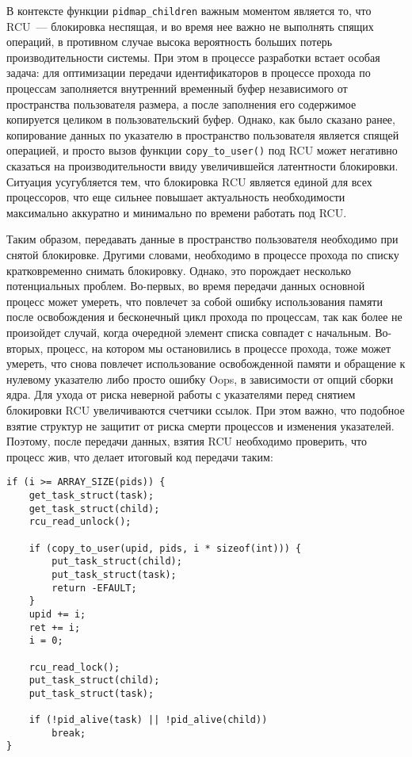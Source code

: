 В контексте функции \texttt{pidmap\_children} важным моментом является то, что
RCU~--- блокировка неспящая, и во время нее важно не выполнять спящих операций,
в противном случае высока вероятность больших потерь производительности системы.
При этом в процессе разработки встает особая задача: для оптимизации передачи
идентификаторов в процессе прохода по процессам заполняется внутренний временный
буфер независимого от пространства пользователя размера, а после заполнения его
содержимое копируется целиком в пользовательский буфер. Однако, как было сказано
ранее, копирование данных по указателю в пространство пользователя является
спящей операцией, и просто вызов функции \texttt{copy\_to\_user()} под RCU может
негативно сказаться на производительности ввиду увеличившейся латентности
блокировки. Ситуация усугубляется тем, что блокировка RCU является единой для
всех процессоров, что еще сильнее повышает актуальность необходимости
максимально аккуратно и минимально по времени работать под RCU.

Таким образом, передавать данные в пространство пользователя необходимо при
снятой блокировке. Другими словами, необходимо в процессе прохода по списку
кратковременно снимать блокировку. Однако, это порождает несколько потенциальных
проблем. Во-первых, во время передачи данных основной процесс может умереть, что
повлечет за собой ошибку использования памяти после освобождения и бесконечный
цикл прохода по процессам, так как более не произойдет случай, когда очередной
элемент списка совпадет с начальным. Во-вторых, процесс, на котором мы
остановились в процессе прохода, тоже может умереть, что снова повлечет
использование освобожденной памяти и обращение к нулевому указателю либо просто
ошибку Oops, в зависимости от опций сборки ядра. Для ухода от риска неверной
работы с указателями перед снятием блокировки RCU увеличиваются счетчики ссылок.
При этом важно, что подобное взятие структур не защитит от риска смерти
процессов и изменения указателей. Поэтому, после передачи данных, взятия RCU
необходимо проверить, что процесс жив, что делает итоговый код передачи таким:
\medskip
\begin{lstlisting}[style=cstyle]
if (i >= ARRAY_SIZE(pids)) {
	get_task_struct(task);
	get_task_struct(child);
	rcu_read_unlock();

	if (copy_to_user(upid, pids, i * sizeof(int))) {
		put_task_struct(child);
		put_task_struct(task);
		return -EFAULT;
	}
	upid += i;
	ret += i;
	i = 0;

	rcu_read_lock();
	put_task_struct(child);
	put_task_struct(task);

	if (!pid_alive(task) || !pid_alive(child))
		break;
}
\end{lstlisting}
\medskip


